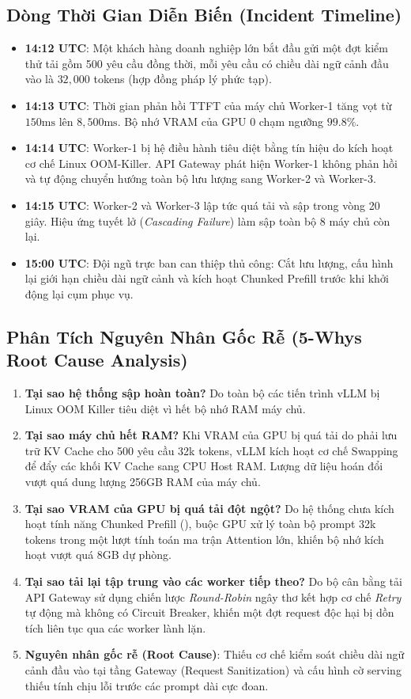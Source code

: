 \subsection{Dòng Thời Gian Diễn Biến (Incident Timeline)}
\begin{itemize}
  \item \textbf{14:12 UTC}: Một khách hàng doanh nghiệp lớn bắt đầu gửi một đợt kiểm thử tải gồm 500 yêu cầu đồng thời, mỗi yêu cầu có chiều dài ngữ cảnh đầu vào là $32,000$ tokens (hợp đồng pháp lý phức tạp).
  \item \textbf{14:13 UTC}: Thời gian phản hồi TTFT của máy chủ Worker-1 tăng vọt từ $150\text{ms}$ lên $8,500\text{ms}$. Bộ nhớ VRAM của GPU 0 chạm ngưỡng $99.8\%$.
  \item \textbf{14:14 UTC}: Worker-1 bị hệ điều hành tiêu diệt bằng tín hiệu  do kích hoạt cơ chế Linux OOM-Killer. API Gateway phát hiện Worker-1 không phản hồi và tự động chuyển hướng toàn bộ lưu lượng sang Worker-2 và Worker-3.
  \item \textbf{14:15 UTC}: Worker-2 và Worker-3 lập tức quá tải và sập trong vòng 20 giây. Hiệu ứng tuyết lở (\textit{Cascading Failure}) làm sập toàn bộ 8 máy chủ còn lại.
  \item \textbf{15:00 UTC}: Đội ngũ trực ban can thiệp thủ công: Cắt lưu lượng, cấu hình lại giới hạn chiều dài ngữ cảnh và kích hoạt Chunked Prefill trước khi khởi động lại cụm phục vụ.
\end{itemize}

\subsection{Phân Tích Nguyên Nhân Gốc Rễ (5-Whys Root Cause Analysis)}
\begin{enumerate}
  \item \textbf{Tại sao hệ thống sập hoàn toàn?} Do toàn bộ các tiến trình vLLM bị Linux OOM Killer tiêu diệt vì hết bộ nhớ RAM máy chủ.
  \item \textbf{Tại sao máy chủ hết RAM?} Khi VRAM của GPU bị quá tải do phải lưu trữ KV Cache cho 500 yêu cầu 32k tokens, vLLM kích hoạt cơ chế Swapping để đẩy các khối KV Cache sang CPU Host RAM. Lượng dữ liệu hoán đổi vượt quá dung lượng 256GB RAM của máy chủ.
  \item \textbf{Tại sao VRAM của GPU bị quá tải đột ngột?} Do hệ thống chưa kích hoạt tính năng Chunked Prefill (), buộc GPU xử lý toàn bộ prompt 32k tokens trong một lượt tính toán ma trận Attention lớn, khiến bộ nhớ kích hoạt vượt quá 8GB dự phòng.
  \item \textbf{Tại sao tải lại tập trung vào các worker tiếp theo?} Do bộ cân bằng tải API Gateway sử dụng chiến lược \textit{Round-Robin} ngây thơ kết hợp cơ chế \textit{Retry} tự động mà không có Circuit Breaker, khiến một đợt request độc hại bị dồn tích liên tục qua các worker lành lặn.
  \item \textbf{Nguyên nhân gốc rễ (Root Cause)}: Thiếu cơ chế kiểm soát chiều dài ngữ cảnh đầu vào tại tầng Gateway (Request Sanitization) và cấu hình cờ serving thiếu tính chịu lỗi trước các prompt dài cực đoan.
\end{enumerate}

